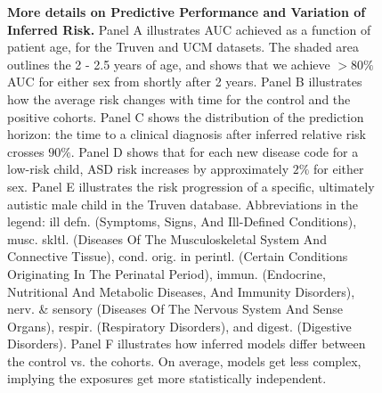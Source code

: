 \documentclass[3p,super,numbers,sort&compress,preprint,10pt]{elsarticle}
\renewcommand{\captionN}[1]{\caption{ #1  }}
\newif\ifFIGS
\begin{document}
\begin{figure}[!ht]
  \captionN{\textbf{More details on Predictive Performance and Variation of Inferred Risk.} Panel A illustrates AUC achieved as a function of
    patient age, for the Truven and UCM datasets. The shaded area outlines the 2 - 2.5  years of age, and  shows that we achieve $>80\%$ AUC for either sex from shortly after 2 years.   Panel B illustrates how the average risk changes with time for the control and the positive cohorts. Panel C shows the distribution of the prediction horizon: the time to a clinical diagnosis after inferred  relative risk crosses $90\%$. Panel D shows that for each new disease code for a low-risk child, ASD risk increases by approximately $2\%$ for either sex. Panel E illustrates the risk progression of a specific, ultimately autistic male child in the Truven database. Abbreviations in the legend: ill defn. (Symptoms, Signs, And Ill-Defined Conditions),   musc. skltl. (Diseases Of The Musculoskeletal System And Connective Tissue), cond. orig. in perintl. (Certain Conditions Originating In The Perinatal Period), immun. (Endocrine, Nutritional And Metabolic Diseases, And Immunity Disorders), nerv. \& sensory (Diseases Of The Nervous System And Sense Organs), respir. (Respiratory Disorders), and digest. (Digestive Disorders). Panel F illustrates  how inferred models differ between the control vs. the \treatment cohorts. On average, models get less complex, implying the exposures get more statistically independent.}\label{fig2}
\end{figure}
\else
{}\label{fig2}
\fi
\ifFIGS
\end{document}
